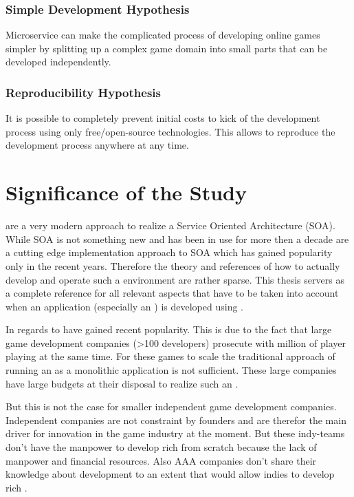 \subsubsection{Simple Development Hypothesis} 
Microservice can make the complicated process of developing online games simpler
by splitting up a complex game domain into small parts that can be developed
independently.

\subsubsection{Reproducibility Hypothesis} 
It is possible to completely prevent initial costs to kick of the development
process using only free/open-source technologies. This allows to reproduce the
development process anywhere at any time.

\section{Significance of the Study}

\mss{} are a very modern approach to realize a Service Oriented Architecture
(SOA). While SOA is not something new and has been in use for more then a decade
 \mss{} are a cutting edge implementation approach to SOA
which has gained popularity only in the recent years. Therefore the theory and
references of how to actually develop and operate such a \ms{} environment are
rather sparse. This thesis servers as a complete reference for all relevant
aspects that have to be taken into account when an application (especially an
\og{}) is developed using \mss{}.

In regards to \ogs{} \mss{} have gained recent popularity. This is due to the
fact that large game development companies (>100 developers) prosecute \ogs{}
with million of player playing at the same time. For these games to scale the
traditional approach of running an \og{} as a monolithic application is not
sufficient. These large companies have large budgets at their disposal to
realize such an \og{}.

But this is not the case for smaller independent game development companies.
Independent companies are not constraint by founders and are therefor the main
driver for innovation in the game industry at the moment. But these  indy-teams don't
have the manpower to develop rich \ogs{} from scratch because the lack of
manpower and financial resources. Also AAA companies don't share their knowledge
about \og{} development to an extent that would allow indies to develop rich
\ogs{}.

